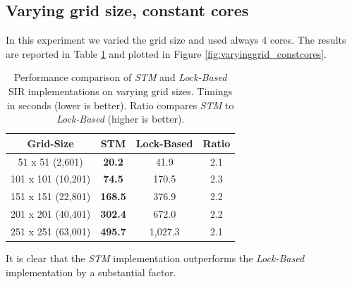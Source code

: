 \subsection{Varying grid size, constant cores}
In this experiment we varied the grid size and used always 4 cores. The results are reported in Table \ref{tab:varyinggrid_constcores} and plotted in Figure \ref{fig:varyinggrid_constcores}.

\begin{table}
	\centering
  	\begin{tabular}{ c || c | c | c }
        Grid-Size          & STM              & Lock-Based   & Ratio \\ \hline \hline 
   		51 x 51 (2,601)    & \textbf{20.2}    & 41.9         & 2.1 \\ \hline
   		101 x 101 (10,201) & \textbf{74.5}    & 170.5        & 2.3 \\ \hline
   		151 x 151 (22,801) & \textbf{168.5}   & 376.9        & 2.2 \\ \hline
   		201 x 201 (40,401) & \textbf{302.4}   & 672.0        & 2.2 \\ \hline
   		251 x 251 (63,001) & \textbf{495.7}   & 1,027.3      & 2.1 \\ \hline \hline
  	\end{tabular}

  	\caption[Performance comparison of \textit{STM} and \textit{Lock-Based} SIR implementations on varying grid sizes]{Performance comparison of \textit{STM} and \textit{Lock-Based} SIR implementations on varying grid sizes. Timings in seconds (lower is better). Ratio compares \textit{STM} to \textit{Lock-Based} (higher is better).}
	\label{tab:varyinggrid_constcores}
\end{table}

It is clear that the \textit{STM} implementation outperforms the \textit{Lock-Based} implementation by a substantial factor.

